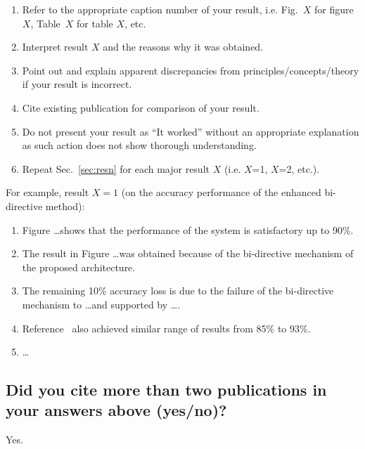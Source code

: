 \begin{enumerate}		
	\item Refer to the appropriate caption number  of your result, i.e. Fig.~$X$ for figure $X$, Table~$X$ for table $X$, etc.	
	\item Interpret result $X$ and the reasons why it was obtained. 
	
	\item Point out and explain apparent discrepancies from principles/concepts/theory if your result is incorrect.
	
	\item Cite existing publication for comparison of your result.
	
	\item Do not present your result as ``It worked'' without an appropriate explanation as such action does not show thorough understanding.
	
	
	\item Repeat Sec.~\ref{sec:resn} for each major result $X$ (i.e. $X$=1, $X$=2, etc.).		
\end{enumerate}

For example, result $X = 1$ (on the accuracy performance of the enhanced bi-directive method):

\begin{enumerate}
	\item Figure \ldots shows that the performance of the system is satisfactory up to 90\%.
	\item The result in Figure \ldots was obtained because of the bi-directive mechanism of the proposed architecture.
	\item The remaining 10\% accuracy loss is due to the failure of the bi-directive mechanism to \ldots and supported by \ldots.
	\item Reference~\cite{Einstein1905} also achieved similar range of results from 85\% to 93\%.
	\item \ldots
\end{enumerate}

\subsection{Did you cite more than two publications in your answers above (yes/no)?}
Yes.	



















